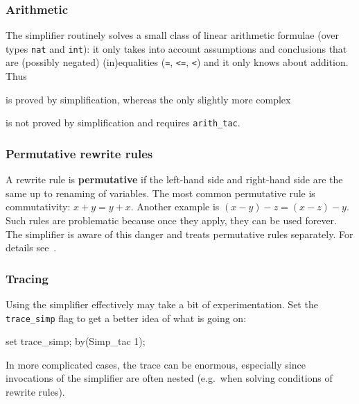 \subsubsection{Arithmetic}

The simplifier routinely solves a small class of linear arithmetic formulae
(over types \texttt{nat} and \texttt{int}): it only takes into account
assumptions and conclusions that are (possibly negated) (in)equalities
(\texttt{=}, \texttt{<=}, \texttt{<}) and it only knows about addition. Thus
\begin{ttbox}
\end{ttbox}
is proved by simplification, whereas the only slightly more complex
\begin{ttbox}
\end{ttbox}
is not proved by simplification and requires \texttt{arith_tac}.

\subsubsection{Permutative rewrite rules}

A rewrite rule is {\bf permutative} if the left-hand side and right-hand side
are the same up to renaming of variables.  The most common permutative rule
is commutativity: $x+y = y+x$.  Another example is $(x-y)-z = (x-z)-y$.  Such
rules are problematic because once they apply, they can be used forever.
The simplifier is aware of this danger and treats permutative rules
separately. For details see~\cite{isabelle-ref}.

\subsubsection{Tracing}

Using the simplifier effectively may take a bit of experimentation.  Set the
\verb$trace_simp$ flag to get a better idea of what is going on:
\begin{ttbox}\makeatother
{}
\ttbreak
set trace_simp;
by(Simp_tac 1);
\ttbreak\makeatother
{}
\ttbreak
{}
\ttbreak\makeatother
{}
\ttbreak
{}
\ttbreak
{}
\end{ttbox}
In more complicated cases, the trace can be enormous, especially since
invocations of the simplifier are often nested (e.g.\ when solving conditions
of rewrite rules).

